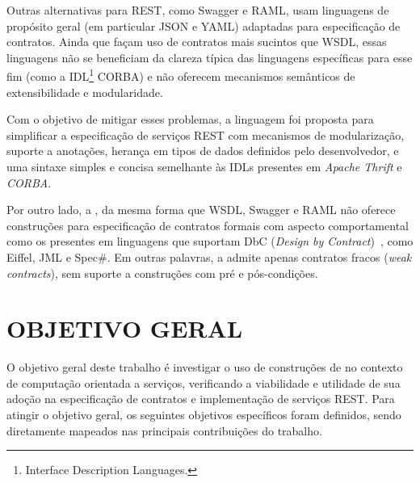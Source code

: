 Outras alternativas para REST, como Swagger\cite{swaggerSite} e
RAML\cite{RAML}, usam linguagens de propósito geral (em
particular JSON\cite{JSon} e YAML\cite{YAML}) adaptadas para especificação de
contratos.
Ainda que façam uso de contratos mais sucintos que WSDL, essas linguagens não se
beneficiam da clareza típica das linguagens específicas para esse fim (como
a IDL\footnote{Interface Description
Languages.} CORBA\cite{corba}) e não oferecem
mecanismos semânticos de extensibilidade e modularidade.

Com o objetivo de mitigar esses problemas, a linguagem \neoidl{} foi proposta
para simplificar a especificação de serviços REST com mecanismos de modularização,
suporte a anotações, herança em tipos de dados definidos pelo desenvolvedor, e
uma sintaxe simples e concisa semelhante às IDLs presentes em \emph{Apache
Thrift}\texttrademark\cite{thrift} e \emph{CORBA}\texttrademark\cite{corba}.

Por outro lado, a \neoidl{}, da mesma forma que WSDL,
Swagger e RAML não oferece construções para especificação de contratos formais
com aspecto comportamental como os presentes em linguagens que
suportam DbC (\emph{Design by Contract})~\cite{meyer1992applying}, como
Eiffel, JML e Spec\#. Em outras palavras, a \neoidl{}  admite apenas
contratos fracos (\textit{weak contracts}), sem suporte a construções com pré e
pós-condições.



\section{OBJETIVO GERAL}
\label{ObjGeral}
\vspace{-6mm}

O objetivo geral deste trabalho é investigar o uso de construções de
\designbycontract{} no contexto de computação orientada a serviços, verificando a
viabilidade e utilidade de sua adoção na especificação de contratos e
implementação de serviços REST. Para atingir o objetivo geral, os seguintes 
objetivos específicos foram definidos, sendo diretamente mapeados nas 
principais contribuições do trabalho. 

\vspace{-6mm}

